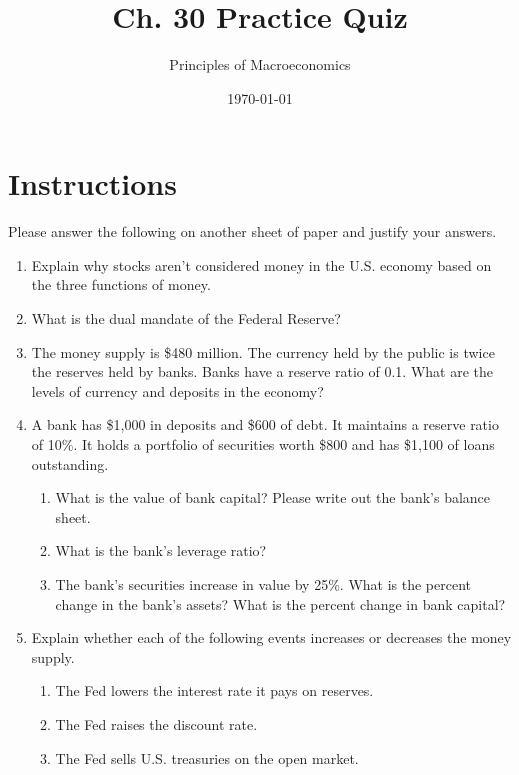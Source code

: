 \documentclass{article}
\title{Ch. 30 Practice Quiz}
\author{Principles of Macroeconomics}
\date{\today}
\begin{document}
\maketitle

\section*{Instructions} Please answer the following on another sheet of paper and justify your answers.

\begin{enumerate}

\item Explain why stocks aren't considered money in the U.S. economy based on the three functions of money.

\item What is the dual mandate of the Federal Reserve?

\item The money supply is \$480 million. The currency held by the public is twice the reserves held by banks. Banks have a reserve ratio of 0.1. What are the levels of currency and deposits in the economy?

\item A bank has \$1,000 in deposits and \$600 of debt. It maintains a reserve ratio of 10\%. It holds a portfolio of securities worth \$800 and has \$1,100 of loans outstanding.

	\begin{enumerate}
	
	\item What is the value of bank capital? Please write out the bank's balance sheet.
	
	\item What is the bank's leverage ratio?
	
	\item The bank's securities increase in value by 25\%. What is the percent change in the bank's assets? What is the percent change in bank capital?
	
	\end{enumerate}
	
\item Explain whether each of the following events increases or decreases the money supply.

	\begin{enumerate}
	
	\item The Fed lowers the interest rate it pays on reserves.
	
	\item The Fed raises the discount rate.
	
	\item The Fed sells U.S. treasuries on the open market. 
	
	\end{enumerate}

\end{enumerate}
\end{document}
